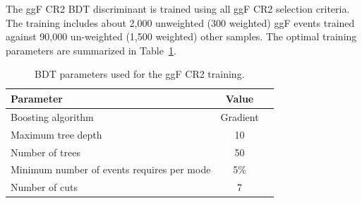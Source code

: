 The ggF CR2 BDT discriminant is trained using all ggF CR2 selection criteria. The training includes about 2,000 unweighted (300 weighted) ggF events trained against 90,000 un-weighted (1,500 weighted) other samples. The optimal training parameters are summarized in Table~\ref{tab:ggFCR2BDTparameters}.
\begin{table}[h!]
\centering
\begin{tabular}{|l|c|c|}
\hline
Parameter                                    & Value     \\
\hline
Boosting algorithm                           & Gradient \\
Maximum tree depth                           &  10      \\
Number of trees                              &  50    \\
Minimum number of events requires per mode   &  5\%     \\ 
Number of cuts                               &  7       \\
\hline
\end{tabular}
\caption{BDT parameters used for the ggF CR2 training.}
\label{tab:ggFCR2BDTparameters}
\end{table}

